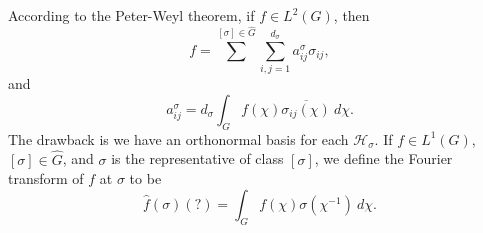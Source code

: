 \documentclass{article}
\begin{document}
According to the Peter-Weyl theorem, if $f \in L^{2}(G)$, then
\begin{equation}
    f = \sum_{}^{[\sigma]\in \widehat{G}} \sum_{i,j=1}^{d_{\sigma}} a^{\sigma}_{ij} \sigma_{ij},
\end{equation}
and
\begin{equation}
    a^{\sigma}_{ij} = d_{\sigma} \int_{G} f(\chi) \overline{\sigma_{ij}(\chi)} \ d\chi.
\end{equation}
The drawback is we have an orthonormal basis for each $\mathcal{H}_{\sigma}$. If $f \in L^{1}(G)$, $[\sigma]\in \widehat{G}$, and $\sigma$ is the representative of class $[\sigma]$, we define the Fourier transform of  $f$  at $\sigma$  to be
\begin{equation}
    \widehat{f}(\sigma) (?) = \int_{G} f(\chi) \sigma(\chi^{-1}) \ d\chi.
\end{equation}
\end{document}
